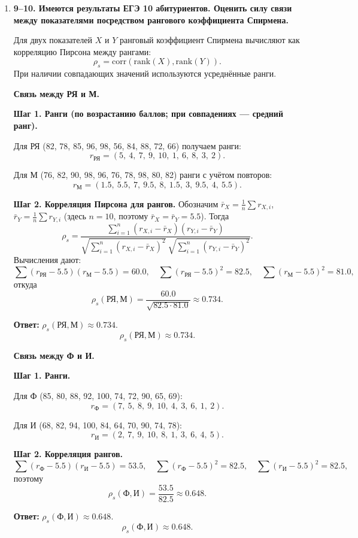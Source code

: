 \documentclass[12pt,a4paper]{article}
\begin{document}
\begin{enumerate}[label=\textbf{\arabic*.}]
\item \textbf{9–10. Имеются результаты ЕГЭ 10 абитуриентов. Оценить силу связи между показателями посредством рангового коэффициента Спирмена.}

Для двух показателей $X$ и $Y$ ранговый коэффициент Спирмена вычисляют как корреляцию Пирсона между рангами:
\[
\rho_s=\mathrm{corr}(\mathrm{rank}(X),\mathrm{rank}(Y)).
\]
При наличии совпадающих значений используются усреднённые ранги.

\textbf{Связь между РЯ и М.}

\textbf{Шаг 1. Ранги (по возрастанию баллов; при совпадениях — средний ранг).}

Для РЯ (82, 78, 85, 96, 98, 56, 84, 88, 72, 66) получаем ранги:
\[
r_{\text{РЯ}}=(5,\ 4,\ 7,\ 9,\ 10,\ 1,\ 6,\ 8,\ 3,\ 2).
\]

Для М (76, 82, 90, 98, 96, 76, 78, 98, 80, 82) ранги с учётом повторов:
\[
r_{\text{М}}=(1.5,\ 5.5,\ 7,\ 9.5,\ 8,\ 1.5,\ 3,\ 9.5,\ 4,\ 5.5).
\]

\textbf{Шаг 2. Корреляция Пирсона для рангов.}
Обозначим $\bar r_X=\frac1n\sum r_{X,i}$, $\bar r_Y=\frac1n\sum r_{Y,i}$ (здесь $n=10$, поэтому $\bar r_X=\bar r_Y=5.5$).
Тогда
\[
\rho_s=\frac{\sum_{i=1}^n (r_{X,i}-\bar r_X)(r_{Y,i}-\bar r_Y)}
{\sqrt{\sum_{i=1}^n (r_{X,i}-\bar r_X)^2}\ \sqrt{\sum_{i=1}^n (r_{Y,i}-\bar r_Y)^2}}.
\]
Вычисления дают:
\[
\sum (r_{\text{РЯ}}-5.5)(r_{\text{М}}-5.5)=60.0,\quad
\sum (r_{\text{РЯ}}-5.5)^2=82.5,\quad
\sum (r_{\text{М}}-5.5)^2=81.0,
\]
откуда
\[
\rho_s(\text{РЯ},\text{М})=\frac{60.0}{\sqrt{82.5\cdot 81.0}}\approx 0.734.
\]

\textbf{Ответ:} $\rho_s(\text{РЯ},\text{М})\approx 0.734$.
\[
\rho_s(\text{РЯ},\text{М})\approx 0.734.
\]

\textbf{Связь между Ф и И.}

\textbf{Шаг 1. Ранги.}

Для Ф (85, 80, 88, 92, 100, 74, 72, 90, 65, 69):
\[
r_{\text{Ф}}=(7,\ 5,\ 8,\ 9,\ 10,\ 4,\ 3,\ 6,\ 1,\ 2).
\]

Для И (68, 82, 94, 100, 84, 64, 70, 90, 74, 78):
\[
r_{\text{И}}=(2,\ 7,\ 9,\ 10,\ 8,\ 1,\ 3,\ 6,\ 4,\ 5).
\]

\textbf{Шаг 2. Корреляция рангов.}
\[
\sum (r_{\text{Ф}}-5.5)(r_{\text{И}}-5.5)=53.5,\quad
\sum (r_{\text{Ф}}-5.5)^2=82.5,\quad
\sum (r_{\text{И}}-5.5)^2=82.5,
\]
поэтому
\[
\rho_s(\text{Ф},\text{И})=\frac{53.5}{82.5}\approx 0.648.
\]

\textbf{Ответ:} $\rho_s(\text{Ф},\text{И})\approx 0.648$.
\[
\rho_s(\text{Ф},\text{И})\approx 0.648.
\]


\end{enumerate}
\end{document}
